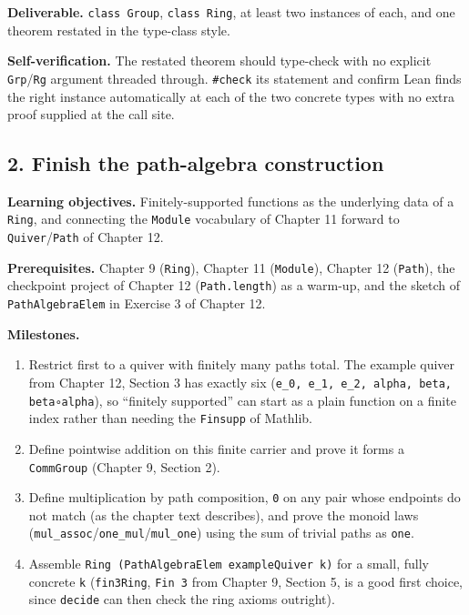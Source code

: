\textbf{Deliverable.} \texttt{class Group}, \texttt{class Ring}, at least two instances of each, and one theorem restated in the type-class style.

\textbf{Self-verification.} The restated theorem should type-check with no explicit \texttt{Grp}/\texttt{Rg} argument threaded through. \texttt{\#check} its statement and confirm Lean finds the right instance automatically at each of the two concrete types with no extra proof supplied at the call site.

\subsection{2. Finish the path-algebra construction}\label{sec:14-next-steps:03-next-projects:3}

\textbf{Learning objectives.} Finitely-supported functions as the underlying data of a \texttt{Ring}, and connecting the \texttt{Module} vocabulary of Chapter 11 forward to \texttt{Quiver}/\texttt{Path} of Chapter 12.

\textbf{Prerequisites.} Chapter 9 (\texttt{Ring}), Chapter 11 (\texttt{Module}), Chapter 12 (\texttt{Path}), the checkpoint project of Chapter 12 (\texttt{Path.length}) as a warm-up, and the sketch of \texttt{PathAlgebraElem} in Exercise 3 of Chapter 12.

\textbf{Milestones.}

\begin{enumerate}
\def\labelenumi{\arabic{enumi}.}
\tightlist
\item
  Restrict first to a quiver with finitely many paths total. The example quiver from Chapter 12, Section 3 has exactly six (\texttt{e\_\allowbreak{}0, e\_\allowbreak{}1, e\_\allowbreak{}2, alpha, beta, beta∘alpha}), so ``finitely supported'' can start as a plain function on a finite index rather than needing the \texttt{Finsupp} of Mathlib.
\item
  Define pointwise addition on this finite carrier and prove it forms a \texttt{CommGroup} (Chapter 9, Section 2).
\item
  Define multiplication by path composition, \texttt{0} on any pair whose endpoints do not match (as the chapter text describes), and prove the monoid laws (\texttt{mul\_\allowbreak{}assoc}/\texttt{one\_\allowbreak{}mul}/\texttt{mul\_\allowbreak{}one}) using the sum of trivial paths as \texttt{one}.
\item
  Assemble \texttt{Ring (PathAlgebraElem exampleQuiver k)} for a small, fully concrete \texttt{k} (\texttt{fin3Ring}, \texttt{Fin 3} from Chapter 9, Section 5, is a good first choice, since \texttt{decide} can then check the ring axioms outright).
\end{enumerate}


